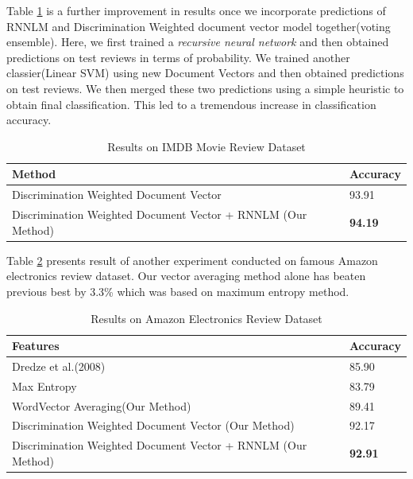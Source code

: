 \documentclass[11pt,a4paper]{article}
\begin{document}
Table \ref{table:IMDB_rnnlm} is a further improvement in results once we incorporate predictions of RNNLM and Discrimination Weighted document vector model together(voting ensemble). Here, we first trained a \emph{recursive neural network} and then obtained predictions on test reviews in terms of probability. We trained another classier(Linear SVM) using new Document Vectors and then obtained predictions on test reviews. We then merged these two predictions using a simple heuristic to obtain final classification. This led to a tremendous increase in classification accuracy.

\begin {table}[H]
\centering
\small
\begin{tabular}{ | p{5.5cm} | p{1.2cm} | }
\hline
\textbf{Method} & \textbf{Accuracy} \\ \hline
Discrimination Weighted Document Vector & 93.91\\ \hline
Discrimination Weighted Document Vector + RNNLM (Our Method) & \textbf{94.19}\\ \hline
\end{tabular}
\caption {Results on IMDB Movie Review Dataset}
\label{table:IMDB_rnnlm}
\end{table}

Table \ref{table:amazon} presents result of another experiment conducted on famous Amazon electronics review dataset. Our vector averaging method alone has beaten previous best by 3.3\% which was based on maximum entropy method.
\begin {table}[H]
\centering
\small
\begin{tabular}{ | p{5.5cm} | p{1.2cm} | }
\hline
\textbf{Features} & \textbf{Accuracy} \\ \hline
Dredze et al.(2008) & 85.90\\ \hline
Max Entropy & 83.79\\ \hline
WordVector Averaging(Our Method) & 89.41\\ \hline
Discrimination Weighted Document Vector (Our Method) & 92.17\\ \hline
Discrimination Weighted Document Vector + RNNLM (Our Method) & \textbf{92.91}\\ \hline
\end{tabular}
\caption {Results on Amazon Electronics Review Dataset}
\label{table:amazon}
\end{table}
\end{document}
